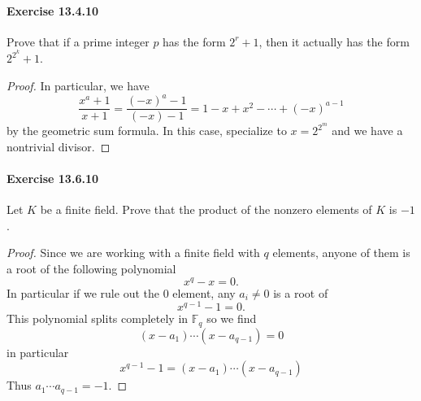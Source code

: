 \documentclass{article}
\begin{document}
\paragraph{Exercise 13.4.10} Prove that if a prime integer $p$ has the form $2^r+1$, then it actually has the form $2^{2^k}+1$.
\begin{proof}
    In particular, we have
$$
\frac{x^a+1}{x+1}=\frac{(-x)^a-1}{(-x)-1}=1-x+x^2-\cdots+(-x)^{a-1}
$$
by the geometric sum formula. In this case, specialize to $x=2^{2^m}$ and we have a nontrivial divisor.
\end{proof}



\paragraph{Exercise 13.6.10} Let $K$ be a finite field. Prove that the product of the nonzero elements of $K$ is $-1$.
\begin{proof}
    Since we are working with a finite field with $q$ elements, anyone of them is a root of the following polynomial
$$
x^q-x=0 .
$$
In particular if we rule out the 0 element, any $a_i \neq 0$ is a root of
$$
x^{q-1}-1=0 .
$$
This polynomial splits completely in $\mathbb{F}_q$ so we find
$$
\left(x-a_1\right) \cdots\left(x-a_{q-1}\right)=0
$$
in particular
$$
x^{q-1}-1=\left(x-a_1\right) \cdots\left(x-a_{q-1}\right)
$$
Thus $a_1 \cdots a_{q-1}=-1$.
\end{proof}
\end{document}
